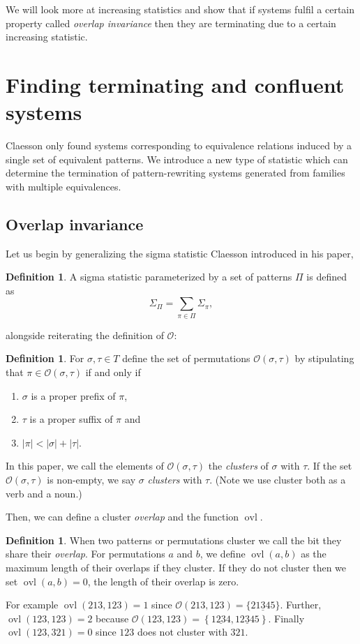 \documentclass[a4paper, 11pt, english]{article}
\theoremstyle{definition}
\newtheorem{definition}[theorem]{Definition}
\newcommand{\Ocal}{\mathcal{O}}
\DeclareMathOperator{\ovl}{ovl}
\begin{document}
We will look more at increasing statistics and show that if systems fulfil a certain property called
\emph{overlap invariance} then they are terminating due to a certain increasing statistic.

\section{Finding terminating and confluent systems}
Claesson only found systems corresponding to equivalence relations induced by a
single set of equivalent patterns. We introduce a new type of statistic which can determine the
termination of pattern-rewriting systems generated from families with multiple equivalences.

\subsection{Overlap invariance}
Let us begin by generalizing the sigma statistic Claesson introduced in his paper,
\begin{definition}
    A sigma statistic parameterized by a set of patterns $\Pi$ is defined as
    \[
        \Sigma_\Pi = \sum_{\pi \in \Pi} \Sigma_{\pi},
    \]
\end{definition}
alongside reiterating the definition of $\Ocal$:
\begin{definition}
    For $\sigma, \tau \in T$ define the set of permutations $\Ocal(\sigma,
    \tau)$ by stipulating that $\pi \in \Ocal(\sigma, \tau)$ if and only if
    \begin{enumerate}
    \item $\sigma$ is a proper prefix of $\pi$,
    \item $\tau$ is a proper suffix of $\pi$ and
    \item $|\pi| < |\sigma| + |\tau|$.
    \end{enumerate}
    In this paper, we call the elements of $\Ocal(\sigma, \tau)$ the \emph{clusters} of $\sigma$ with $\tau$.
    If the set $\Ocal(\sigma, \tau)$ is non-empty, we say $\sigma$ \emph{clusters} with $\tau$.
    (Note we use cluster both as a verb and a noun.)
\end{definition}

Then, we can define a cluster \emph{overlap} and the function $\ovl$.
\begin{definition}
  When two patterns or permutations cluster we call the bit they share their \emph{overlap}.
  For permutations $a$ and $b$, we define $\ovl(a,b)$ as the maximum length of their overlaps if they 
  cluster. If they do not cluster then we set $\ovl(a,b)=0$, the length of their overlap is zero.

  For example $\ovl(213, 123) = 1$ since $\Ocal(213, 123) = \{ 21\underline{3}45 \}$. Further, $\ovl(123, 123) = 2$
  because $\Ocal(123, 123) = \left\{ 1\underline{23}4, 12\underline{3}45 \right\}$. Finally
  $\ovl(123, 321)=0$ since $123$ does not cluster with $321$.
\end{definition}
\end{document}
